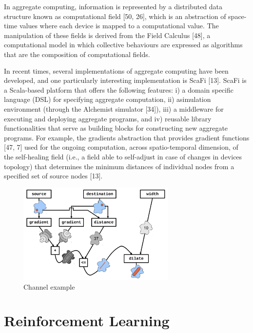 \documentclass[12pt,a4paper,openright,twoside]{book}
\begin{document}
In aggregate computing, information is represented by a distributed data structure known as computational field [50, 26],
    which is an abstraction of space-time values where each device is mapped to a computational value.
    The manipulation of these fields is derived from the Field Calculus [48], a computational model in which collective 
    behaviours are expressed as algorithms that are the composition of computational fields.

In recent times, several implementations of aggregate computing have been developed, and one particularly interesting 
    implementation is ScaFi [13]. ScaFi is a Scala-based platform that offers the following features: 
    i) a domain specific language (DSL) for specifying aggregate computation, 
    ii) asimulation environment (through the Alchemist simulator [34]), 
    iii) a middleware for executing and deploying aggregate programs, and 
    iv) reusable library functionalities that serve as building blocks for constructing new aggregate programs. 
    For example, the gradients abstraction that provides gradient functions [47, 7] used for the ongoing computation, 
    across spatio-temporal dimension, of the self-healing field (i.e., a field able to self-adjust in case of changes 
    in devices topology) that determines the minimum distances of individual nodes from a specified set of source 
    nodes [13].

\begin{figure}[h!]
    \centering
    \includegraphics[width=0.7\textwidth]{figures/channel.png}
    \caption{Channel example}
    \label{fig:channel}
\end{figure}



%
\section{Reinforcement Learning}
%
\end{document}
